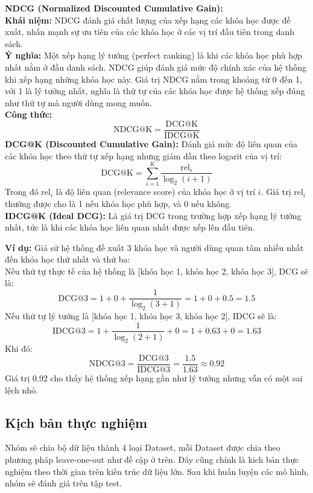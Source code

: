 \textbf{NDCG (Normalized Discounted Cumulative Gain):} \\
\textbf{Khái niệm:} NDCG đánh giá chất lượng của xếp hạng các khóa học được đề xuất, nhấn mạnh sự ưu tiên của các khóa học ở các vị trí đầu tiên trong danh sách. \\
\textbf{Ý nghĩa:} Một xếp hạng lý tưởng (perfect ranking) là khi các khóa học phù hợp nhất nằm ở đầu danh sách. NDCG giúp đánh giá mức độ chính xác của hệ thống khi xếp hạng những khóa học này. Giá trị NDCG nằm trong khoảng từ 0 đến 1, với 1 là lý tưởng nhất, nghĩa là thứ tự của các khóa học được hệ thống xếp đúng như thứ tự mà người dùng mong muốn. \\

\textbf{Công thức:}
\[
\text{NDCG@K} = \frac{\text{DCG@K}}{\text{IDCG@K}}
\]
\textbf{DCG@K (Discounted Cumulative Gain):} Đánh giá mức độ liên quan của các khóa học theo thứ tự xếp hạng nhưng giảm dần theo logarit của vị trí:
\[
\text{DCG@K} = \sum_{i=1}^{K} \frac{\text{rel}_i}{\log_2(i+1)}
\]
Trong đó $\text{rel}_i$ là độ liên quan (relevance score) của khóa học ở vị trí $i$. Giá trị $\text{rel}_i$ thường được cho là 1 nếu khóa học phù hợp, và 0 nếu không. \\

\textbf{IDCG@K (Ideal DCG):} Là giá trị DCG trong trường hợp xếp hạng lý tưởng nhất, tức là khi các khóa học liên quan nhất được xếp lên đầu tiên.

\textbf{Ví dụ:} Giả sử hệ thống đề xuất 3 khóa học và người dùng quan tâm nhiều nhất đến khóa học thứ nhất và thứ ba: \\
Nếu thứ tự thực tế của hệ thống là [khóa học 1, khóa học 2, khóa học 3], DCG sẽ là:
\[
\text{DCG@3} = 1 + 0 + \frac{1}{\log_2(3+1)} = 1 + 0 + 0.5 = 1.5
\]
Nếu thứ tự lý tưởng là [khóa học 1, khóa học 3, khóa học 2], IDCG sẽ là:
\[
\text{IDCG@3} = 1 + \frac{1}{\log_2(2+1)} + 0 = 1 + 0.63 + 0 = 1.63
\]
Khi đó:
\[
\text{NDCG@3} = \frac{\text{DCG@3}}{\text{IDCG@3}} = \frac{1.5}{1.63} \approx 0.92
\]
Giá trị 0.92 cho thấy hệ thống xếp hạng gần như lý tưởng nhưng vẫn có một sai lệch nhỏ.




\subsection{Kịch bản thực nghiệm}
Nhóm sẽ chia bộ dữ liệu thành 4 loại Dataset, mỗi Dataset được chia theo phương pháp leave-one-out như đề cập ở trên. Đây cũng chính là kich bản thực nghiệm theo thời gian trên kiến trúc dữ liệu lớn. Sau khi huấn luyện các mô hình, nhóm sẽ đánh giá trên tập test.

